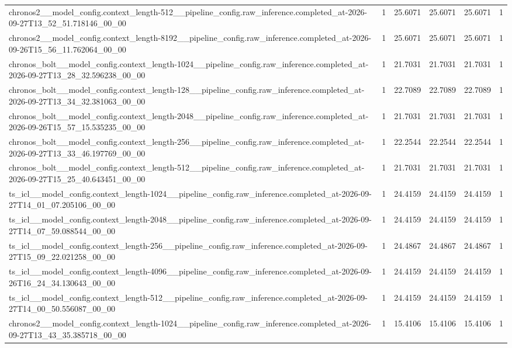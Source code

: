 \begin{tabular}{llllll}
chronos2\_\_model\_config.context\_length-512\_\_pipeline\_config.raw\_inference.completed\_at-2026-09-27T13\_52\_51.718146\_00\_00 & 1 & 25.6071 & 25.6071 & 25.6071 & 1 \\
chronos2\_\_model\_config.context\_length-8192\_\_pipeline\_config.raw\_inference.completed\_at-2026-09-26T15\_56\_11.762064\_00\_00 & 1 & 25.6071 & 25.6071 & 25.6071 & 1 \\
chronos\_bolt\_\_model\_config.context\_length-1024\_\_pipeline\_config.raw\_inference.completed\_at-2026-09-27T13\_28\_32.596238\_00\_00 & 1 & 21.7031 & 21.7031 & 21.7031 & 1 \\
chronos\_bolt\_\_model\_config.context\_length-128\_\_pipeline\_config.raw\_inference.completed\_at-2026-09-27T13\_34\_32.381063\_00\_00 & 1 & 22.7089 & 22.7089 & 22.7089 & 1 \\
chronos\_bolt\_\_model\_config.context\_length-2048\_\_pipeline\_config.raw\_inference.completed\_at-2026-09-26T15\_57\_15.535235\_00\_00 & 1 & 21.7031 & 21.7031 & 21.7031 & 1 \\
chronos\_bolt\_\_model\_config.context\_length-256\_\_pipeline\_config.raw\_inference.completed\_at-2026-09-27T13\_33\_46.197769\_00\_00 & 1 & 22.2544 & 22.2544 & 22.2544 & 1 \\
chronos\_bolt\_\_model\_config.context\_length-512\_\_pipeline\_config.raw\_inference.completed\_at-2026-09-27T15\_25\_40.643451\_00\_00 & 1 & 21.7031 & 21.7031 & 21.7031 & 1 \\
ts\_icl\_\_model\_config.context\_length-1024\_\_pipeline\_config.raw\_inference.completed\_at-2026-09-27T14\_01\_07.205106\_00\_00 & 1 & 24.4159 & 24.4159 & 24.4159 & 1 \\
ts\_icl\_\_model\_config.context\_length-2048\_\_pipeline\_config.raw\_inference.completed\_at-2026-09-27T14\_07\_59.088544\_00\_00 & 1 & 24.4159 & 24.4159 & 24.4159 & 1 \\
ts\_icl\_\_model\_config.context\_length-256\_\_pipeline\_config.raw\_inference.completed\_at-2026-09-27T15\_09\_22.021258\_00\_00 & 1 & 24.4867 & 24.4867 & 24.4867 & 1 \\
ts\_icl\_\_model\_config.context\_length-4096\_\_pipeline\_config.raw\_inference.completed\_at-2026-09-26T16\_24\_34.130643\_00\_00 & 1 & 24.4159 & 24.4159 & 24.4159 & 1 \\
ts\_icl\_\_model\_config.context\_length-512\_\_pipeline\_config.raw\_inference.completed\_at-2026-09-27T14\_00\_50.556087\_00\_00 & 1 & 24.4159 & 24.4159 & 24.4159 & 1 \\
chronos2\_\_model\_config.context\_length-1024\_\_pipeline\_config.raw\_inference.completed\_at-2026-09-27T13\_43\_35.385718\_00\_00 & 1 & 15.4106 & 15.4106 & 15.4106 & 1 \\

\end{tabular}
